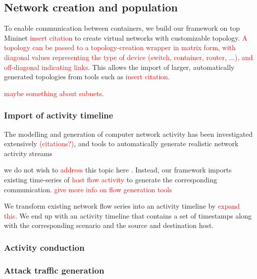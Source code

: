 \documentclass{article}
\begin{document}
\subsection{Network creation and population}


To enable communication between containers, we build our framework on top Mininet \textcolor{red}{insert citation} to create virtual networks with customizable topology. 
\textcolor{red}{A topology can be passed to a topology-creation wrapper in matrix form, with diagonal values representing the type of device (switch, container, router, ...), and off-diagonal indicating links}. This allows the import of larger, automatically generated topologies from tools such as \textcolor{red}{insert citation}. 

\textcolor{red}{maybe something about subnets}. 

\subsubsection*{Import of activity timeline}

The modelling and generation of computer network activity has been investigated extensively \textcolor{red}{(citations?)}, and tools to automatically generate realistic network activity streams 

we do not wish to \textcolor{red}{address} this topic here . Instead, our framework imports existing time-series of \textcolor{red}{host flow activity} to generate the corresponding communication. \textcolor{red}{give more info on flow generation tools} 

We transform existing network flow series into an activity timeline by \textcolor{red}{expand this}. We end up with an activity timeline that contains a set of timestamps along with the corresponding scenario and the source and destination host. 

\subsubsection*{Activity conduction}


\subsubsection*{Attack traffic generation}
\end{document}
